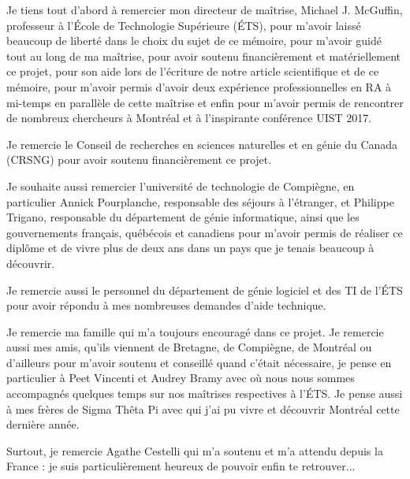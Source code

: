 Je tiens tout d'abord à remercier mon directeur de maîtrise, Michael J. McGuffin, professeur à l'École de Technologie Supérieure (ÉTS), pour m'avoir laissé beaucoup de liberté dans le choix du sujet de ce mémoire, pour m'avoir guidé tout au long de ma maîtrise, pour avoir soutenu financièrement et matériellement ce projet, pour son aide lors de l'écriture de notre article scientifique et de ce mémoire, pour m'avoir permis d'avoir deux expérience professionnelles en RA à mi-temps en parallèle de cette maîtrise et enfin pour m'avoir permis de rencontrer de nombreux chercheurs à Montréal et à l'inspirante conférence UIST 2017.

Je remercie le Conseil de recherches en sciences naturelles et en génie du Canada (CRSNG) pour avoir soutenu financièrement ce projet.

Je souhaite aussi remercier l'université de technologie de Compiègne, en particulier Annick Pourplanche, responsable des séjours à l'étranger, et Philippe Trigano, responsable du département de génie informatique, ainsi que les gouvernements français, québécois et canadiens pour m'avoir permis de réaliser ce diplôme et de vivre plus de deux ans dans un pays que je tenais beaucoup à découvrir.

Je remercie aussi le personnel du département de génie logiciel et des TI de l'ÉTS pour avoir répondu à mes nombreuses demandes d'aide technique.

Je remercie ma famille qui m'a toujours encouragé dans ce projet. Je remercie aussi mes amis, qu'ils viennent de Bretagne, de Compiègne, de Montréal ou d'ailleurs pour m'avoir soutenu et conseillé quand c'était nécessaire, je pense en particulier à Peet Vincenti et Audrey Bramy avec où nous nous sommes accompagnés quelques temps sur nos maîtrises respectives à l'ÉTS. Je pense aussi à mes frères de Sigma Thêta Pi avec qui j'ai pu vivre et découvrir Montréal cette dernière année.

Surtout, je remercie Agathe Cestelli qui m'a soutenu et m'a attendu depuis la France : je suis particulièrement heureux de pouvoir enfin te retrouver...